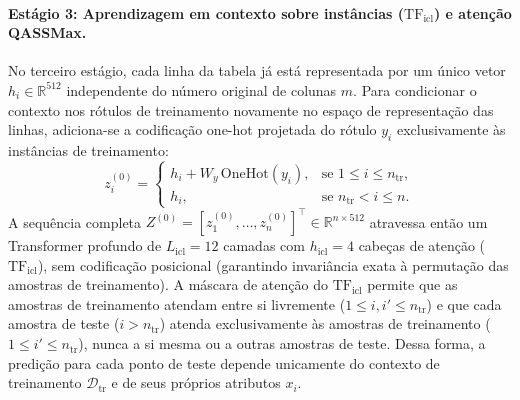 \documentclass[11pt,a4paper]{article}
\begin{document}
\paragraph{Estágio 3: Aprendizagem em contexto sobre instâncias ($\mathrm{TF}_{\mathrm{icl}}$) e atenção QASSMax.}
No terceiro estágio, cada linha da tabela já está representada por um único vetor $h_i \in \mathbb{R}^{512}$ independente do número original de colunas $m$. Para condicionar o contexto nos rótulos de treinamento novamente no espaço de representação das linhas, adiciona-se a codificação one-hot projetada do rótulo $y_i$ exclusivamente às instâncias de treinamento:
\begin{equation}
    z_i^{(0)} =
    \begin{cases}
        h_i + W_y \, \mathrm{OneHot}(y_i), & \text{se } 1 \le i \le n_{\mathrm{tr}}, \\
        h_i, & \text{se } n_{\mathrm{tr}} < i \le n.
    \end{cases}
    \label{eq:icl_input}
\end{equation}
A sequência completa $Z^{(0)} = [z_1^{(0)}, \dots, z_n^{(0)}]^\top \in \mathbb{R}^{n \times 512}$ atravessa então um Transformer profundo de $L_{\mathrm{icl}} = 12$ camadas com $h_{\mathrm{icl}} = 4$ cabeças de atenção ($\mathrm{TF}_{\mathrm{icl}}$), sem codificação posicional (garantindo invariância exata à permutação das amostras de treinamento). A máscara de atenção do $\mathrm{TF}_{\mathrm{icl}}$ permite que as amostras de treinamento atendam entre si livremente ($1 \le i, i' \le n_{\mathrm{tr}}$) e que cada amostra de teste ($i > n_{\mathrm{tr}}$) atenda exclusivamente às amostras de treinamento ($1 \le i' \le n_{\mathrm{tr}}$), nunca a si mesma ou a outras amostras de teste. Dessa forma, a predição para cada ponto de teste depende unicamente do contexto de treinamento $\mathcal{D}_{\mathrm{tr}}$ e de seus próprios atributos $x_i$.
\end{document}
